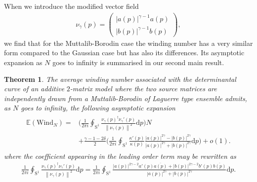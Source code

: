 \documentclass[pdflatex,sn-mathphys-num]{sn-jnl}
\theoremstyle{thmstyleone}
\newtheorem{theorem}{Theorem}[section]
\numberwithin{equation}{section}
\begin{document}
When we introduce the modified vector field
\begin{align}\label{id:nugamma}
    \nu_{\gamma}\left(p\right)=\begin{pmatrix}
        |a\left(p\right)|^{\gamma-1}a(p)
        \\
        |b\left(p\right)|^{\gamma-1}b(p)
    \end{pmatrix},
\end{align}
we find that for the Muttalib-Borodin case the winding number has a very similar form compared to the Gaussian case but has also its differences. Its asymptotic expansion as $N$ goes to infinity is summarised in our second main result.

\begin{theorem}\label{theorem2}
The average winding number associated with the determinantal curve of an additive $2$-matrix model where the two source matrices are independently drawn from a Muttalib-Borodin of Laguerre type ensemble admits, as $N$ goes to infinity, the following asymptotic expansion
    \begin{align}\label{windingasymptotic2}
\begin{split}
    \mathbb{E}\left(\mathrm{Wind}_{N} \right)=&\Bigg(\frac{1}{2\pi i}\oint_{\mathrm{S}^{1}}^{}\frac{\nu_{\gamma}\left( p \right)^{\dagger}\nu_{\gamma}'\left( p \right)}{\left\| \nu_{\gamma}\left( p \right) \right\|^{2}}\mathrm{d}p\Bigg)N\\
    &+\frac{\gamma-1-2\delta}{2}\Bigg(\frac{1}{2\pi i}\oint_{\mathrm{S}^{1}}^{}\frac{\kappa'\left( p \right)}{\kappa\left( p \right)}\frac{| a\left( p \right) |^{2\gamma}-| b\left( p \right) |^{2\gamma}}{| a\left( p \right) |^{2\gamma}+| b\left( p \right) |^{2\gamma}}\mathrm{d}p\Bigg)+o\left(1\right).
\end{split}    
\end{align}
where the coefficient appearing in the leading order term may be rewritten as
\begin{align}\label{windingasymptotic2.b}
    \frac{1}{2\pi i}\oint_{\mathrm{S}^{1}}^{}\frac{\nu_{\gamma}\left( p \right)^{\dagger}\nu_{\gamma}'\left( p \right)}{\left\| \nu_{\gamma}\left( p \right) \right\|^{2}}\mathrm{d}p=\frac{1}{2\pi i}\oint_{\mathrm{S}^{1}}^{}\frac{|a\left( p \right)|^{2\gamma-2} a'\left( p \right)\overline{a\left( p \right)}+|b\left( p \right)|^{2\gamma-2} b'\left( p \right)\overline{b\left( p \right)}}{|a\left( p \right)|^{2\gamma} +|b\left( p \right)|^{2\gamma} }\mathrm{d}p.
\end{align}
\end{theorem}
\end{document}
